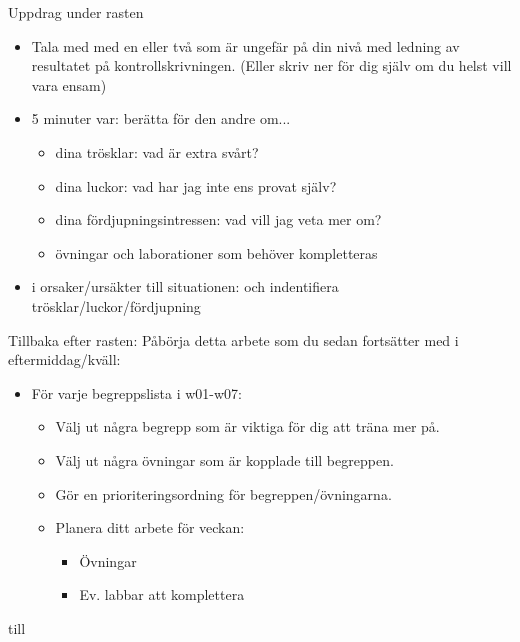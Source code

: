 \begin{Slide}{Uppdrag under rasten}
\begin{itemize}
\item Tala med med en eller två som är ungefär på din nivå med ledning av resultatet på kontrollskrivningen. (Eller skriv ner för dig själv om du helst vill vara ensam)

\item 5 minuter var: berätta för den andre om... 
\begin{itemize}
 \item dina trösklar: vad är extra svårt?
 \item dina luckor: vad har jag inte ens provat själv?
 \item dina fördjupningsintressen: vad vill jag veta mer om?
 \item övningar och laborationer som behöver kompletteras
\end{itemize}
\item {} i orsaker/ursäkter till situationen:  och  indentifiera trösklar/luckor/fördjupning
\end{itemize}
\end{Slide}


\begin{Slide}{Tillbaka efter rasten:}
Påbörja detta arbete som du sedan fortsätter med i eftermiddag/kväll:  
\begin{itemize}
\item För varje begreppslista i w01-w07:
\begin{itemize}
\item Välj ut några begrepp som är viktiga för dig att träna mer på.
\item Välj ut några övningar som är kopplade till begreppen.
\item Gör en prioriteringsordning för begreppen/övningarna.
\item Planera ditt arbete för veckan:
\begin{itemize}
\item Övningar
\item Ev. labbar att komplettera
\end{itemize}
\end{itemize}
\end{itemize}
 till 
\end{Slide}


